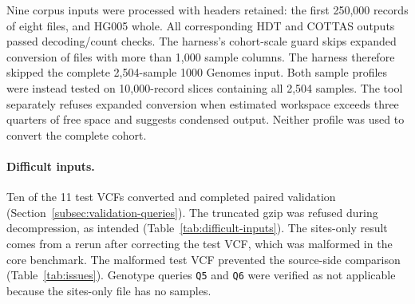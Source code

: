 \documentclass[11pt]{article}
\begin{document}
Nine corpus inputs were processed with headers retained: the first 250,000 records of eight files, and HG005 whole.
All corresponding HDT and COTTAS outputs passed decoding/count checks.
The harness's cohort-scale guard skips expanded conversion of files with more than 1,000 sample columns.
The harness therefore skipped the complete 2,504-sample 1000 Genomes input.
Both sample profiles were instead tested on 10,000-record slices containing all 2,504 samples.
The tool separately refuses expanded conversion when estimated workspace exceeds three quarters of free space and suggests condensed output.
Neither profile was used to convert the complete cohort.

\paragraph{Difficult inputs.}
Ten of the 11 test VCFs converted and completed paired validation (Section~\ref{subsec:validation-queries}).
The truncated gzip was refused during decompression, as intended (Table~\ref{tab:difficult-inputs}).
The sites-only result comes from a rerun after correcting the test VCF, which was malformed in the core benchmark.
The malformed test VCF prevented the source-side comparison (Table~\ref{tab:issues}).
Genotype queries \texttt{Q5} and \texttt{Q6} were verified as not applicable because the sites-only file has no samples.
\end{document}
